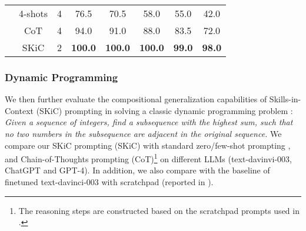 \documentclass{article} \usepackage{arxiv}
\begin{document}
\begin{table}[t]
\begin{tabular}{c|c|c|cc|ccc}
                          & 4-shots     &4       & 76.5                             & 70.5          & 58.0          & 55.0          & 42.0          \\
                          & CoT       &4         & 94.0                             & 91.0         & 88.0          & 83.5          & 72.0          \\
                          & SKiC  &2             & \textbf{100.0}                    & \textbf{100.0} & \textbf{100.0} & \textbf{99.0} & \textbf{98.0} \\ \bottomrule
\end{tabular} 
\end{table}




\subsubsection{Dynamic Programming}
We then further evaluate the compositional generalization capabilities of Skills-in-Context (SKiC) prompting in solving a classic dynamic programming problem \citep{dziri2023faith}: \textit{Given a sequence of integers, find a subsequence with the highest sum, such that no two numbers in the subsequence are adjacent in the original sequence.} We compare our SKiC prompting (SKiC) with standard zero/few-shot prompting \citep{brown2020language}, and Chain-of-Thoughts prompting (CoT)\footnote{The reasoning steps are constructed based on the scratchpad prompts used in \citet{dziri2023faith}.}  \citep{wei2022chain} on different LLMs (text-davinvi-003, ChatGPT and GPT-4). In addition, we also compare with the baseline of finetuned text-davinci-003 with scratchpad (reported in \citet{dziri2023faith}).
\end{document}
